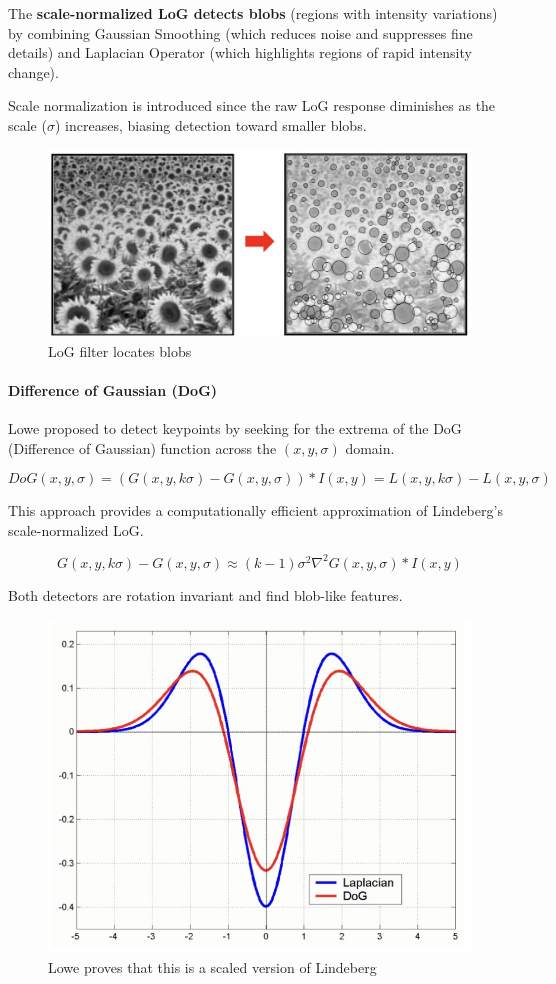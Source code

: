 \documentclass{article}
\begin{document}
The \textbf{scale-normalized LoG detects blobs} (regions with intensity variations) by combining Gaussian Smoothing (which reduces noise and suppresses fine details) and Laplacian Operator (which highlights regions of rapid intensity change).

Scale normalization is introduced since the raw LoG response diminishes as the scale ($\sigma$) increases, biasing detection toward smaller blobs.

\begin{figure}[htbp]
  \centering
  \includegraphics[width=0.7\linewidth]{./img/sunflower_blobs.jpg}
  \caption{LoG filter locates blobs}
  \label{fig:sunflower_blobs}
\end{figure}

\paragraph{Difference of Gaussian (DoG)}

Lowe proposed to detect keypoints by seeking for the extrema of the DoG (Difference of Gaussian) function across the $(x,y,\sigma)$ domain.

$$DoG(x,y,\sigma) = (G(x,y,k\sigma) - G(x,y,\sigma)) * I(x,y) = L(x,y,k\sigma) - L(x,y,\sigma)$$

This approach provides a computationally efficient approximation of Lindeberg's scale-normalized LoG.

$$G(x,y,k\sigma) - G(x,y,\sigma) \approx (k-1)\sigma^2\nabla^2 G(x,y,\sigma) * I(x,y)$$

Both detectors are rotation invariant and find blob-like features.

\begin{figure}[htbp]
  \centering
  \includegraphics[width=0.5\linewidth]{./img/dog.jpg}
  \caption{Lowe proves that this is a scaled version of Lindeberg}
  \label{fig:dog}
\end{figure}
\end{document}
